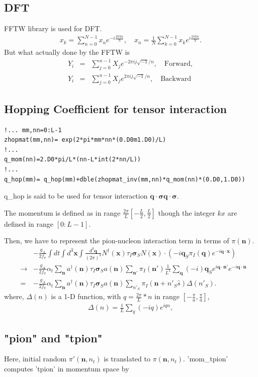 \documentclass[10pt]{book}
\def\bm{\boldsymbol}
\newcommand{\bea}{\begin{eqnarray}}
\newcommand{\eea}{\end{eqnarray}}
\newcommand{\no}{\nonumber \\}
\def\vs{{\bm \sigma}}
\def\vn{{\bm n}}
\def\vq{{\bm q}}
\def\vx{{\bm x}}
\begin{document}
\subsection{DFT}
FFTW library is used for DFT.
\bea 
x_k=\sum_{n=0}^{N-1} x_n e^{-i\frac{2\pi k n}{N}},
\quad x_n=\frac{1}{N}\sum_{k=0}^{N-1} x_k e^{i \frac{2\pi k n}{N}}.
\eea 
But what actually done by the FFTW is
\bea 
Y_i&=& \sum_{j=0}^{n-1} X_j e^{-2\pi i j \sqrt{-1}/n},\quad \mbox{Forward}, \no 
Y_i&=& \sum_{j=0}^{n-1} X_j e^{2\pi i j \sqrt{-1}/n},\quad \mbox{Backward}
\eea 


\subsection{Hopping Coefficient for tensor interaction} 
\begin{lstlisting}[frame=single]
!... mm,nn=0:L-1
zhopmat(mm,nn)= exp(2*pi*mm*nn*(0.D0m1.D0)/L)
!...
q_mom(nn)=2.D0*pi/L*(nn-L*int(2*nn/L))
!...
q_hop(mm)= q_hop(mm)+dble(zhopmat_inv(mm,nn)*q_mom(nn)*(0.D0,1.D0))
\end{lstlisting} 
q\_hop is said to be used for tensor interaction $\vq\cdot\vs\vq\cdot\vs$.

The momentum is defined as in range $\frac{2\pi}{L}[-\frac{L}{2},\frac{L}{2}]$ though
the integer $kx$ are defined in range $[0:L-1]$.

Then, we have to represent the pion-nucleon interaction term 
in terms of $\pi(\vn)$. 
\bea 
 & &   -\frac{g_A}{2f_\pi} \int dt \int d^3\vx \int \frac{d^3\vq}{(2\pi)^3}
     N^\dagger(\vx) \tau_I \vs_S N(\vx)\cdot
      (-i\vq_S \pi_I(\vq)e^{-i\vq\cdot\vx}) \no 
&\to&  -\frac{g_A}{2f_\pi}\alpha_t \sum_{\vn} a^\dagger(\vn)\tau_I \vs_S a(\vn) 
       \sum_{\vn'} \pi_I(\vn') \frac{1}{L^3}\sum_{\vq} (-i)\vq_S 
       e^{i\vq\cdot\vn'}e^{-i\vq\cdot\vn} \no 
&=& -\frac{g_A}{2f_\pi}\alpha_t \sum_{\vn} a^\dagger(\vn)\tau_I \vs_S a(\vn) 
       \sum_{n'_S} \pi_I(\vn+n'_S\hat{s}) \Delta (n'_S).           
\eea 
where, $\Delta(n)$ is a 1-D function, 
with $q=\frac{2\pi}{L}*n$ in range $[-\frac{\pi}{a},\frac{\pi}{a}]$,
\bea 
\Delta(n)=\frac{1}{L}\sum_{q} (-i q) e^{i q n},
\eea 


\subsection{"pion" and "tpion" } 

Here, initial random $\pi'(\vn,n_t)$ is translated to $\pi(\vn,n_t)$.
'mom\_tpion' computes 'tpion' in  momentum space by
\end{document}
